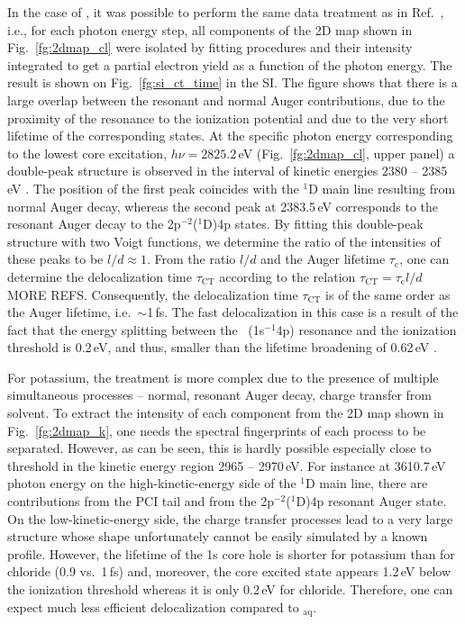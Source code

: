In the case of \cli, it was possible to perform the same data treatment as in Ref.\ \cite{ceolin15:022502}, i.e., for each photon energy step, all components of the 2D map shown in Fig.\ \ref{fg:2dmap_cl} were isolated by fitting procedures and their intensity integrated to get a partial electron yield as a function of the photon energy. The result is shown on Fig.\ \ref{fg:si_ct_time} in the SI. The figure shows that there is a large overlap between the resonant and normal Auger contributions, due to the proximity of the resonance to the ionization potential and due to the very short lifetime of the corresponding states. At the specific photon energy corresponding to the lowest core excitation, $h\nu = 2825.2$\,eV (Fig.\ \ref{fg:2dmap_cl}, upper panel) a double-peak structure is observed in the interval of kinetic energies 2380 -- 2385\,eV . The position of the first peak coincides with the $^1$D main line resulting from normal Auger decay, whereas the second peak at 2383.5\,eV corresponds to the resonant Auger decay to the 2p$^{-2}$($^1$D)4p states. By fitting this double-peak structure with two Voigt functions, we determine the ratio of the intensities of these peaks to be $l/d \approx 1$. From the ratio $l/d$ and the Auger lifetime $\tau_{\text{c}}$, one can determine the delocalization time $\tau_{\text{CT}}$ according to the relation $\tau_{\text{CT}} = \tau_{\text{c}}l/d$ \citep{foehlisch05:373}{\color{red}MORE REFS}. Consequently, the delocalization time $\tau_{\text{CT}}$ is of the same order as the Auger lifetime, i.e.\ $\sim$1\,fs. The fast delocalization in this case is a result of the fact that the energy splitting between the \cli~(1s$^{-1}$4p) resonance and the ionization threshold is 0.2\,eV, and thus, smaller than the lifetime broadening of 0.62\,eV \citep{ceolin17:263003}.


For potassium, the treatment is more complex due to the presence of multiple simultaneous processes -- normal, resonant Auger decay, charge transfer from solvent. To extract the intensity of each component from the 2D map shown in Fig.\ \ref{fg:2dmap_k}, one needs the spectral fingerprints of each process to be separated. However, as can be seen, this is hardly possible especially close to threshold in the kinetic energy region 2965 -- 2970\,eV. For instance at 3610.7\,eV photon energy on the high-kinetic-energy side of the $^1$D main line, there are contributions from the PCI tail and from the 2p$^{-2}$($^1$D)4p resonant Auger state. On the low-kinetic-energy side, the charge transfer processes lead to a very large structure whose shape unfortunately cannot be easily simulated by a known profile. However, the lifetime of the 1s core hole is shorter for potassium than for chloride (0.9 vs.\ 1\,fs) and, moreover, the core excited state appears 1.2\,eV below the ionization threshold whereas it is only 0.2\,eV for chloride. Therefore, one can expect much less efficient delocalization compared to \cli$_{\text{aq}}$.